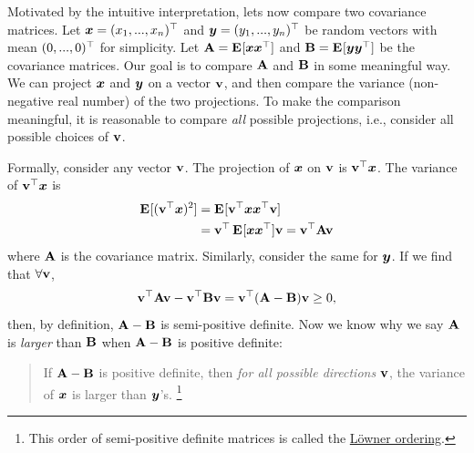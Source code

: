 \documentclass[a4paper]{article}
\begin{document}
\begin{multicols*}{2}
Motivated by the intuitive interpretation, lets now compare two covariance matrices.
Let $\xx=(x_1,...,x_n)\T$ and $\yy=(y_1,...,y_n)\T$ be random vectors with mean $(0,...,0)\T$ for simplicity.
Let $\AA=\E{\xx\xx\T}$ and $\BB=\E{\yy\yy\T}$ be the covariance matrices.
Our goal is to compare $\AA$ and $\BB$ in some meaningful way.
We can project $\xx$ and $\yy$ on a vector $\vv$,
and then compare the variance (non-negative real number) of the two projections.
To make the comparison meaningful,
it is reasonable to compare \emph{all} possible projections,
i.e., consider all possible choices of $\vv$.

Formally, consider any vector $\vv$.
The projection of $\xx$ on $\vv$ is $\vv\T \xx$.
The variance of $\vv\T \xx$ is 
\begin{align*}
	\E{(\vv\T \xx)^2}
	&= \E{\vv\T \xx\xx\T\vv} \\
	&= \vv\T\E{\xx\xx\T}\vv
	= \vv\T \AA\vv
\end{align*}
where $\AA$ is the covariance matrix.
Similarly, consider the same for $\yy$.
If we find that $\forall\vv$,
\begin{align*}
	\vv\T \AA\vv - \vv\T \BB\vv
	= \vv\T (\AA - \BB)\vv
	\geq 0,
\end{align*}
then, by definition, $\AA-\BB$ is semi-positive definite.
Now we know why we say $\AA$ is \emph{larger} than $\BB$ when $\AA-\BB$ is positive definite:
\begin{quote}
	If $\AA-\BB$ is positive definite,
	then \emph{for all possible directions $\vv$},
	the variance of $\xx$ is larger than $\yy$'s.
	\footnote{
		This order of semi-positive definite matrices is called the
		\href{https://en.wikipedia.org/wiki/Loewner_order}{L\"{o}wner ordering}.
	}
\end{quote}


\end{multicols*}
\end{document}
